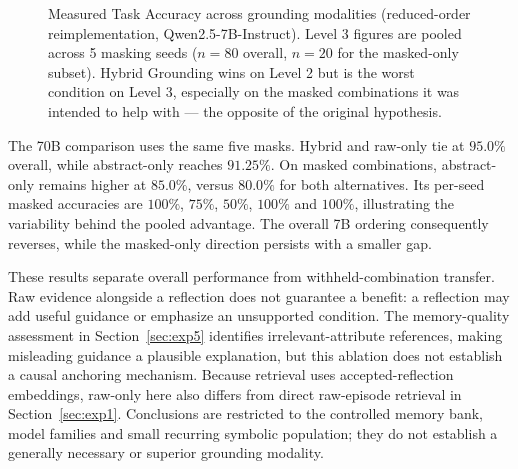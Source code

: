 \documentclass[onecolumn]{IEEEtran}
\numberwithin{equation}{section}
\theoremstyle{definition}
\theoremstyle{remark}
\begin{document}
\begin{figure}[htbp]
    \centering
    \caption{Measured Task Accuracy across grounding modalities (reduced-order reimplementation, Qwen2.5-7B-Instruct). Level 3 figures are pooled across 5 masking seeds ($n=80$ overall, $n=20$ for the masked-only subset). Hybrid Grounding wins on Level 2 but is the worst condition on Level 3, especially on the masked combinations it was intended to help with — the opposite of the original hypothesis.}
    \label{fig:exp2_ablation}
\end{figure}

The 70B comparison uses the same five masks. Hybrid and raw-only tie at $95.0\%$ overall, while abstract-only reaches $91.25\%$. On masked combinations, abstract-only remains higher at $85.0\%$, versus $80.0\%$ for both alternatives. Its per-seed masked accuracies are $100\%$, $75\%$, $50\%$, $100\%$ and $100\%$, illustrating the variability behind the pooled advantage. The overall 7B ordering consequently reverses, while the masked-only direction persists with a smaller gap.

These results separate overall performance from withheld-combination transfer. Raw evidence alongside a reflection does not guarantee a benefit: a reflection may add useful guidance or emphasize an unsupported condition. The memory-quality assessment in Section~\ref{sec:exp5} identifies irrelevant-attribute references, making misleading guidance a plausible explanation, but this ablation does not establish a causal anchoring mechanism. Because retrieval uses accepted-reflection embeddings, raw-only here also differs from direct raw-episode retrieval in Section~\ref{sec:exp1}. Conclusions are restricted to the controlled memory bank, model families and small recurring symbolic population; they do not establish a generally necessary or superior grounding modality.
\end{document}
